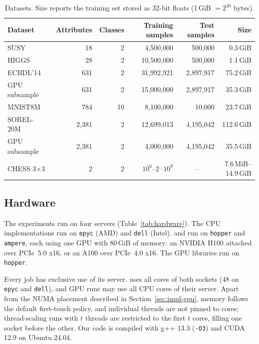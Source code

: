 \begin{table}
\caption{Datasets. Size reports the training set stored as 32-bit floats (1\,GiB $= 2^{30}$ bytes).}
\label{tab:datasets}
\centering
\setlength{\tabcolsep}{1.1pt}
\begin{tabular}{@{}lrrrrr@{}}
\toprule
Dataset & Attributes & Classes & Training samples & Test samples & Size \\
\midrule
SUSY~\cite{baldi2014higgs}          & 18   & 2  & 4,500,000  & 500,000   & 0.3\,GiB \\
HIGGS~\cite{baldi2014higgs}         & 28   & 2  & 10,500,000 & 500,000   & 1.1\,GiB \\
ECBDL'14~\cite{triguero2015ecbdl}   & 631  & 2  & 31,992,921 & 2,897,917 & 75.2\,GiB \\
\quad GPU subsample                 & 631  & 2  & 15,000,000 & 2,897,917 & 35.3\,GiB \\
MNIST8M~\cite{loosli2007mnist8m}    & 784  & 10 & 8,100,000  & 10,000    & 23.7\,GiB \\
SOREL-20M~\cite{harang2020sorel}    & 2,381 & 2  & 12,699,013 & 4,195,042 & 112.6\,GiB \\
\quad GPU subsample                 & 2,381 & 2  & 4,000,000  & 4,195,042 & 35.5\,GiB \\
CHESS 3$\times$3                    & 2    & 2  & $10^6$--$2 \cdot 10^9$ & \multicolumn{1}{c}{--} & 7.6\,MiB--14.9\,GiB \\
\bottomrule
\end{tabular}
\end{table}

\subsection{Hardware}
The experiments run on four servers (Table~\ref{tab:hardware}). The CPU implementations run on \texttt{epyc} (AMD) and \texttt{dell} (Intel). \ImplGpu{} and \ImplHybrid{} run on \texttt{hopper} and \texttt{ampere}, each using one GPU with 80\,GiB of memory: an NVIDIA H100 attached over PCIe~5.0 x16, or an A100 over PCIe~4.0 x16. The GPU libraries run on \texttt{hopper}.

Every job has exclusive use of its server. \ImplParallel{} uses all cores of both sockets (48 on \texttt{epyc} and \texttt{dell}), and GPU runs may use all CPU cores of their server. Apart from the NUMA placement described in Section~\ref{sec:impl-gpu}, memory follows the default first-touch policy, and individual threads are not pinned to cores; thread-scaling runs with $t$ threads are restricted to the first $t$ cores, filling one socket before the other. Our code is compiled with g++ 13.3 (\texttt{-O3}) and CUDA 12.9 on Ubuntu 24.04.

